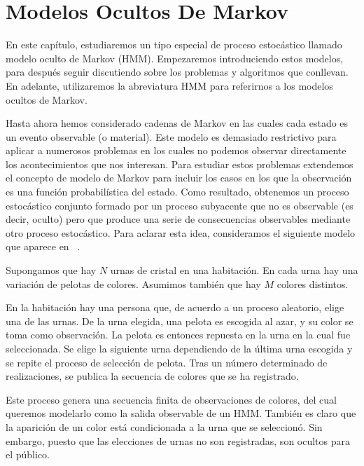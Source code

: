 \chapter{Modelos Ocultos De Markov}

En este capítulo, estudiaremos un tipo especial de proceso estocástico llamado modelo oculto de Markov (HMM). Empezaremos introduciendo estos modelos, para después seguir discutiendo sobre los problemas y algoritmos que conllevan. En adelante, utilizaremos la abreviatura HMM para referirnos a los modelos ocultos de Markov.

Hasta ahora hemos considerado cadenas de Markov en las cuales cada estado es un evento observable (o material). Este modelo es demasiado restrictivo para aplicar a numerosos problemas en los cuales no podemos observar directamente los acontecimientos que nos interesan. Para estudiar estos problemas extendemos el concepto de modelo de Markov para incluir los casos en los que la observación es una función probabilística del estado. Como resultado, obtenemos un proceso estocástico conjunto formado por un proceso subyacente que no es observable (es decir, oculto) pero que produce una serie de consecuencias observables mediante otro proceso estocástico. Para aclarar esta idea, consideramos el siguiente modelo que aparece en ~\cite{Rabiner}.

\begin{exampleth}
Supongamos que hay $N$ urnas de cristal en una habitación. En cada urna hay una variación de pelotas de colores. Asumimos también que hay $M$ colores distintos. 

En la habitación hay una persona que, de acuerdo a un proceso aleatorio, elige una de las urnas. De la urna elegida, una pelota es escogida al azar, y su color se toma como observación. La pelota es entonces repuesta en la urna en la cual fue seleccionada. Se elige la siguiente urna dependiendo de la última urna escogida y se repite el proceso de selección de pelota. Tras un número determinado de realizaciones, se publica la secuencia de colores que se ha registrado.

Este proceso genera una secuencia finita de observaciones de colores, del cual queremos modelarlo como la salida observable de un HMM. También es claro que la aparición de un color está condicionada a la urna que se seleccionó. Sin embargo, puesto que las elecciones de urnas no son registradas, son ocultos para el público.

\end{exampleth}

